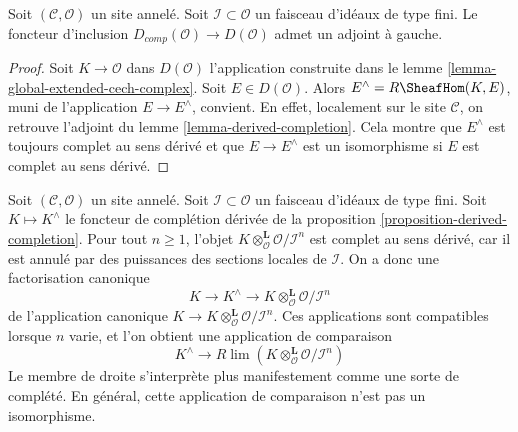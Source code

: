 \begin{proposition}
\label{proposition-derived-completion}
Soit $(\mathcal{C}, \mathcal{O})$ un site annelé.
Soit $\mathcal{I} \subset \mathcal{O}$ un faisceau d'idéaux
de type fini. Le foncteur d'inclusion
$D_{comp}(\mathcal{O}) \to D(\mathcal{O})$ admet un adjoint à gauche.
\end{proposition}

\begin{proof}
Soit $K \to \mathcal{O}$ dans $D(\mathcal{O})$ l'application construite dans le
lemme \ref{lemma-global-extended-cech-complex}. Soit $E \in D(\mathcal{O})$.
Alors $E^\wedge = R\SheafHom(K, E)$, muni de l'application $E \to E^\wedge$,
convient. En effet, localement sur le site $\mathcal{C}$, on
retrouve l'adjoint du lemme \ref{lemma-derived-completion}.
Cela montre que $E^\wedge$ est toujours complet au sens dérivé et que
$E \to E^\wedge$ est un isomorphisme si $E$ est complet au sens dérivé.
\end{proof}

\begin{remark}
\label{remark-compare-with-completion}
Soit $(\mathcal{C}, \mathcal{O})$ un site annelé.
Soit $\mathcal{I} \subset \mathcal{O}$ un faisceau d'idéaux
de type fini. Soit $K \mapsto K^\wedge$ le foncteur de complétion dérivée
de la proposition \ref{proposition-derived-completion}.
Pour tout $n \geq 1$, l'objet
$K \otimes_\mathcal{O}^\mathbf{L} \mathcal{O}/\mathcal{I}^n$
est complet au sens dérivé, car il est annulé par des puissances des
sections locales de $\mathcal{I}$. On a donc une factorisation canonique
$$
K \to K^\wedge \to K \otimes_\mathcal{O}^\mathbf{L} \mathcal{O}/\mathcal{I}^n
$$
de l'application canonique
$K \to K \otimes_\mathcal{O}^\mathbf{L} \mathcal{O}/\mathcal{I}^n$.
Ces applications sont compatibles lorsque $n$ varie, et l'on obtient une application de comparaison
$$
K^\wedge
\longrightarrow
R\lim \left(K \otimes_\mathcal{O}^\mathbf{L} \mathcal{O}/\mathcal{I}^n\right)
$$
Le membre de droite s'interprète plus manifestement comme une sorte de complété.
En général, cette application de comparaison n'est pas un isomorphisme.
\end{remark}

